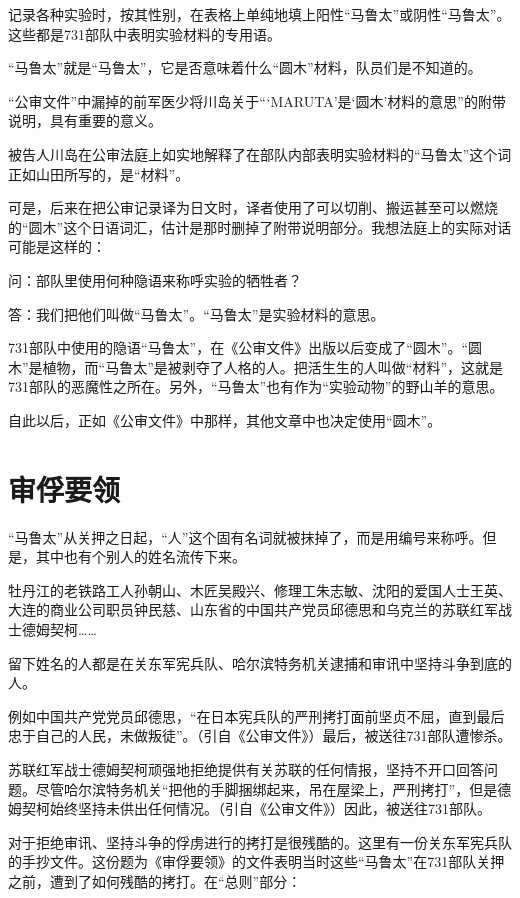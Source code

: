 \documentclass[a4paper,12pt,UTF8,twoside]{ctexbook}
\begin{document}
记录各种实验时，按其性别，在表格上单纯地填上阳性“马鲁太”或阴性“马鲁太”。这些都是731部队中表明实验材料的专用语。

“马鲁太”就是“马鲁太”，它是否意味着什么“圆木”材料，队员们是不知道的。

“公审文件”中漏掉的前军医少将川岛关于“‘MARUTA’是‘圆木’材料的意思”的附带说明，具有重要的意义。

被告人川岛在公审法庭上如实地解释了在部队内部表明实验材料的“马鲁太”这个词正如山田所写的，是“材料”。

可是，后来在把公审记录译为日文时，译者使用了可以切削、搬运甚至可以燃烧的“圆木”这个日语词汇，估计是那时删掉了附带说明部分。我想法庭上的实际对话可能是这样的：

问：部队里使用何种隐语来称呼实验的牺牲者？

答：我们把他们叫做“马鲁太”。“马鲁太”是实验材料的意思。

731部队中使用的隐语“马鲁太”，在《公审文件》出版以后变成了“圆木”。“圆木”是植物，而“马鲁太”是被剥夺了人格的人。把活生生的人叫做“材料”，这就是731部队的恶魔性之所在。另外，“马鲁太”也有作为“实验动物”的野山羊的意思。

自此以后，正如《公审文件》中那样，其他文章中也决定使用“圆木”。

\section{审俘要领}

“马鲁太”从关押之日起，“人”这个固有名词就被抹掉了，而是用编号来称呼。但是，其中也有个别人的姓名流传下来。

牡丹江的老铁路工人孙朝山、木匠吴殿兴、修理工朱志敏、沈阳的爱国人士王英、大连的商业公司职员钟民慈、山东省的中国共产党员邱德思和乌克兰的苏联红军战士德姆契柯……

留下姓名的人都是在关东军宪兵队、哈尔滨特务机关逮捕和审讯中坚持斗争到底的人。

例如中国共产党党员邱德思，“在日本宪兵队的严刑拷打面前坚贞不屈，直到最后忠于自己的人民，未做叛徒”。（引自《公审文件》）最后，被送往731部队遭惨杀。

苏联红军战士德姆契柯顽强地拒绝提供有关苏联的任何情报，坚持不开口回答问题。尽管哈尔滨特务机关“把他的手脚捆绑起来，吊在屋梁上，严刑拷打”，但是德姆契柯始终坚持未供出任何情况。（引自《公审文件》）因此，被送往731部队。

对于拒绝审讯、坚持斗争的俘虏进行的拷打是很残酷的。这里有一份关东军宪兵队的手抄文件。这份题为《审俘要领》的文件表明当时这些“马鲁太”在731部队关押之前，遭到了如何残酷的拷打。在“总则”部分：
\end{document}
